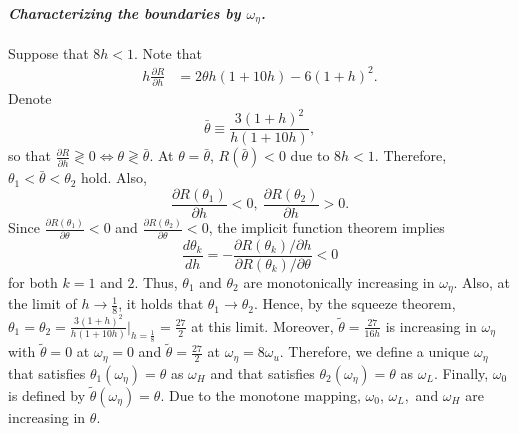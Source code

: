 \paragraph*{\textmd{\textit{Characterizing the boundaries by $\omega_{\eta}$. }}}

Suppose that $8h<1$. Note that 
\begin{align*}
h\frac{\partial R}{\partial h} & =2\theta h(1+10h)-6(1+h)^{2}.
\end{align*}
Denote 
\[
\bar{\theta}\equiv\frac{3(1+h)^{2}}{h(1+10h)},
\]
so that $\frac{\partial R}{\partial h}\gtrless0\Leftrightarrow\theta\gtrless\bar{\theta}$. At $\theta=\bar{\theta}$, $R(\bar{\theta})<0$  due to $8h<1$. Therefore, $\theta_{1}<\bar{\theta}<\theta_{2}$ hold. Also, 
\[
\frac{\partial R(\theta_{1})}{\partial h}<0,\ \frac{\partial R(\theta_{2})}{\partial h}>0.
\]
 Since $\frac{\partial R(\theta_{1})}{\partial\theta}<0$ and $\frac{\partial R(\theta_{2})}{\partial\theta}<0$, the implicit function theorem implies
\[
\frac{d\theta_{k}}{dh}=-\frac{\partial R(\theta_{k})/\partial h}{\partial R(\theta_{k})/\partial\theta}<0
\]
for both $k=1$ and $2$. Thus, $\theta_{1}$ and $\theta_{2}$ are monotonically increasing in $\omega_{\eta}$. Also, at the limit of $h\rightarrow\frac{1}{8}$, it holds that $\theta_{1}\rightarrow\theta_{2}$. Hence, by the squeeze theorem, $\theta_{1}=\theta_{2}=\frac{3(1+h)^{2}}{h(1+10h)}|_{h=\frac{1}{8}}=\frac{27}{2}$ at this limit. Moreover, $\tilde{\theta}=\frac{27}{16h}$ is increasing in $\omega_{\eta}$ with $\tilde{\theta}=0$ at $\omega_{\eta}=0$ and $\tilde{\theta}=\frac{27}{2}$ at $\omega_{\eta}=8\omega_{u}$. Therefore, we define a unique $\omega_{\eta}$ that satisfies $\theta_{1}(\omega_{\eta})=\theta$ as $\omega_{H}$ and that satisfies $\theta_{2}(\omega_{\eta})=\theta$ as $\omega_{L}$. Finally, $\omega_{0}$ is defined by $\tilde{\theta}(\omega_{\eta})=\theta$. Due to the monotone mapping, $\omega_{0}$, $\omega_{L},$ and $\omega_{H}$ are increasing in $\theta$.

